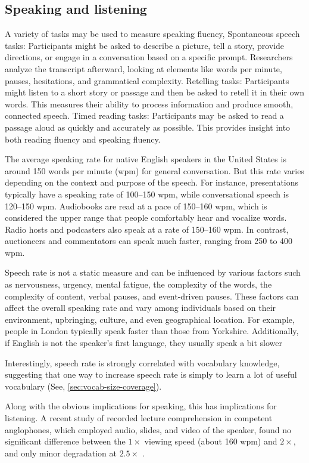 \subsection{Speaking and listening}

A variety of tasks may be used to measure speaking fluency, Spontaneous speech tasks: Participants might be asked to describe a picture, tell a story, provide directions, or engage in a conversation based on a specific prompt. Researchers analyze the transcript afterward, looking at elements like words per minute, pauses, hesitations, and grammatical complexity.
Retelling tasks: Participants might listen to a short story or passage and then be asked to retell it in their own words. This measures their ability to process information and produce smooth, connected speech.
Timed reading tasks: Participants may be asked to read a passage aloud as quickly and accurately as possible. This provides insight into both reading fluency and speaking fluency.

The average speaking rate for native English speakers in the United States is around 150 words per minute (wpm) for general conversation. But this rate varies depending on the context and purpose of the speech. For instance, presentations typically have a speaking rate of 100--150 wpm, while conversational speech is 120--150 wpm. Audiobooks are read at a pace of 150--160 wpm, which is considered the upper range that people comfortably hear and vocalize words. Radio hosts and podcasters also speak at a rate of 150--160 wpm. In contrast, auctioneers and commentators can speak much faster, ranging from 250 to 400 wpm.

Speech rate is not a static measure and can be influenced by various factors such as nervousness, urgency, mental fatigue, the complexity of the words, the complexity of content, verbal pauses, and event-driven pauses. These factors can affect the overall speaking rate and vary among individuals based on their environment, upbringing, culture, and even geographical location. For example, people in London typically speak faster than those from Yorkshire. Additionally, if English is not the speaker's first language, they usually speak a bit slower

Interestingly, speech rate is strongly correlated with vocabulary knowledge, suggesting that one way to increase speech rate is simply to learn a lot of useful vocabulary (See, \ref{sec:vocab-size-coverage}).

Along with the obvious implications for speaking, this has implications for listening. A recent study of recorded lecture comprehension in competent anglophones, which employed audio, slides, and video of the speaker, found no significant difference between the $1\times$ viewing speed (about 160 wpm) and $2\times$, and only minor degradation at $2.5\times$ \citep{Murphy2021}.

